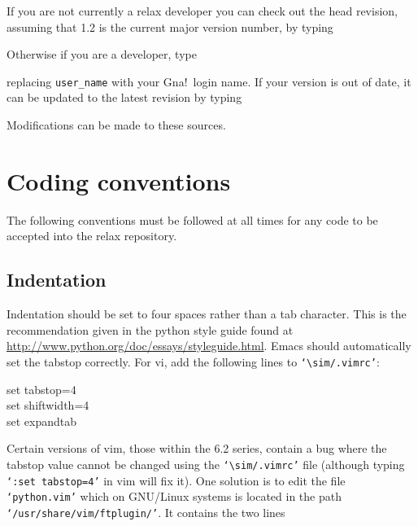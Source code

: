If you are not currently a relax developer you can check out the head revision, assuming that 1.2 is the current major version number, by typing


Otherwise if you are a developer, type


replacing \texttt{user\_name} with your Gna!\ login name.  If your version is out of date, it can be updated to the latest revision by typing


Modifications can be made to these sources.




\section{Coding conventions}

The following conventions must be followed at all times for any code to be accepted into the relax repository.



\subsection{Indentation}

Indentation should be set to four spaces rather than a tab character.  This is the recommendation given in the python style guide found at \href{http://www.python.org/doc/essays/styleguide.html}{http://www.python.org/doc/essays/styleguide.html}.  Emacs should automatically set the tabstop correctly.  For vi, add the following lines to \texttt{`$\sim$/.vimrc'}:

\begin{exampleenv}
set tabstop=4 \\
set shiftwidth=4 \\
set expandtab
\end{exampleenv}

Certain versions of vim, those within the 6.2 series, contain a bug where the tabstop value cannot be changed using the \texttt{`$\sim$/.vimrc'} file (although typing \texttt{`:set tabstop=4'} in vim will fix it).  One solution is to edit the file \texttt{`python.vim'} which on GNU/Linux systems is located in the path \texttt{`/usr/share/vim/ftplugin/'}.  It contains the two lines

